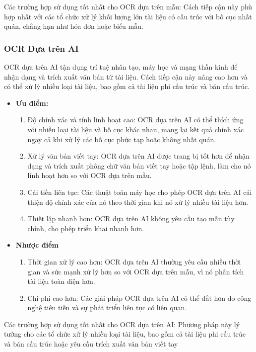Các trường hợp sử dụng tốt nhất cho OCR dựa trên mẫu: Cách tiếp cận này phù hợp nhất với các tổ chức xử lý khối lượng lớn tài liệu có cấu trúc với bố cục nhất quán, chẳng hạn như hóa đơn hoặc biểu mẫu.

\subsubsection{OCR Dựa trên AI}
OCR dựa trên AI tận dụng trí tuệ nhân tạo, máy học và mạng thần kinh để nhận dạng và trích xuất văn bản từ tài liệu. Cách tiếp cận này nâng cao hơn và có thể xử lý nhiều loại tài liệu, bao gồm cả tài liệu phi cấu trúc và bán cấu trúc. \cite{template-ai-ocr}
\begin{itemize}
    \item[] \textbf{Ưu điểm:} \begin{enumerate}
            \item Độ chính xác và tính linh hoạt cao: OCR dựa trên AI có thể thích ứng với nhiều loại tài liệu và bố cục khác nhau, mang lại kết quả chính xác ngay cả khi xử lý các bố cục phức tạp hoặc không nhất quán.
            \item Xử lý văn bản viết tay: OCR dựa trên AI được trang bị tốt hơn để nhận dạng và trích xuất phông chữ văn bản viết tay hoặc tập lệnh, làm cho nó linh hoạt hơn so với OCR dựa trên mẫu.
            \item Cải tiến liên tục: Các thuật toán máy học cho phép OCR dựa trên AI cải thiện độ chính xác của nó theo thời gian khi nó xử lý nhiều tài liệu hơn.
            \item Thiết lập nhanh hơn: OCR dựa trên AI không yêu cầu tạo mẫu tùy chỉnh, cho phép triển khai nhanh hơn.
        \end{enumerate}
    \item[] \textbf{Nhược điểm} \begin{enumerate}
            \item Thời gian xử lý cao hơn: OCR dựa trên AI thường yêu cầu nhiều thời gian và sức mạnh xử lý hơn so với OCR dựa trên mẫu, vì nó phân tích tài liệu toàn diện hơn.
            \item Chi phí cao hơn: Các giải pháp OCR dựa trên AI có thể đắt hơn do công nghệ tiên tiến và sự phát triển liên tục có liên quan.

        \end{enumerate}
\end{itemize}

Các trường hợp sử dụng tốt nhất cho OCR dựa trên AI: Phương pháp này lý tưởng cho các tổ chức xử lý nhiều loại tài liệu, bao gồm cả tài liệu phi cấu trúc và bán cấu trúc hoặc yêu cầu trích xuất văn bản viết tay

